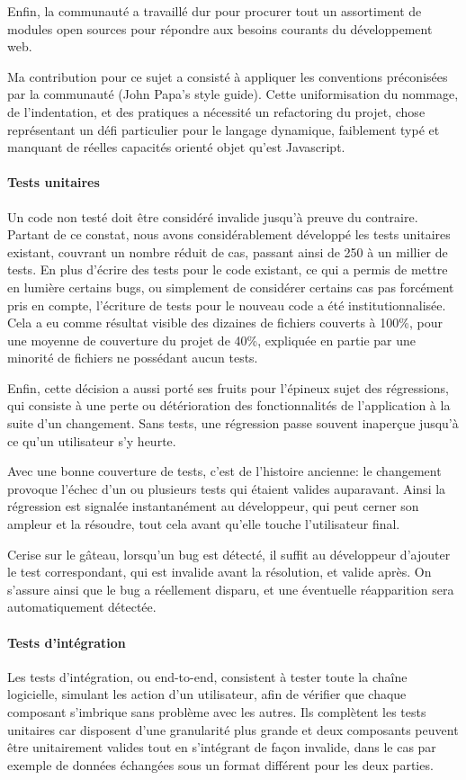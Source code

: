 \documentclass[a4paper,french,12pt]{article}
\begin{document}
	Enfin, la communauté a travaillé dur pour procurer tout un assortiment de modules open sources pour répondre aux besoins courants du développement web.
	
	Ma contribution pour ce sujet a consisté à appliquer les conventions préconisées par la communauté (John Papa's style guide). Cette uniformisation du nommage, de l'indentation, et des pratiques a nécessité un refactoring du projet, chose représentant un défi particulier pour le langage dynamique, faiblement typé et manquant de réelles capacités orienté objet qu'est Javascript.
	
		\paragraph{Tests unitaires}
			Un code non testé doit être considéré invalide jusqu'à preuve du contraire. Partant de ce constat, nous avons considérablement développé les tests unitaires existant, couvrant un nombre réduit de cas, passant ainsi de 250 à un millier de tests. 
	En plus d'écrire des tests pour le code existant, ce qui a permis de mettre en lumière certains bugs, ou simplement de considérer certains cas pas forcément pris en compte, l'écriture de tests pour le nouveau code a été institutionnalisée. 
	Cela a eu comme résultat visible des dizaines de fichiers couverts à 100\%, pour une moyenne de couverture du projet de 40\%, expliquée en partie par une minorité de fichiers ne possédant aucun tests.
	
	Enfin, cette décision a aussi porté ses fruits pour l'épineux sujet des régressions, qui consiste à une perte ou détérioration des fonctionnalités de l'application à la suite d'un changement. Sans tests, une régression passe souvent inaperçue jusqu'à ce qu'un utilisateur s'y heurte.
	
	Avec une bonne couverture de tests, c'est de l'histoire ancienne: le changement provoque l'échec d'un ou plusieurs tests qui étaient valides auparavant. Ainsi la régression est signalée instantanément au développeur, qui peut cerner son ampleur et la résoudre, tout cela avant qu'elle touche l'utilisateur final.
	
	Cerise sur le gâteau, lorsqu'un bug est détecté, il suffit au développeur d'ajouter le test correspondant, qui est invalide avant la résolution, et valide après. On s'assure ainsi que le bug a réellement disparu, et une éventuelle réapparition sera automatiquement détectée.
	
	\paragraph{Tests d'intégration}
	Les tests d'intégration, ou end-to-end, consistent à tester toute la chaîne logicielle, simulant les action d'un utilisateur, afin de vérifier que chaque composant s'imbrique sans problème avec les autres. Ils complètent les tests unitaires car disposent d'une granularité plus grande et deux composants peuvent être unitairement valides tout en s'intégrant de façon invalide, dans le cas par exemple de données échangées sous un format différent pour les deux parties.
	
\end{document}
